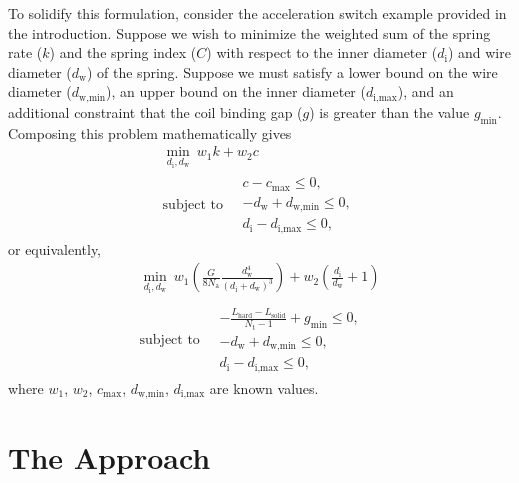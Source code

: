 \documentclass[10pt]{article}
\begin{document}
To solidify this formulation, consider the acceleration switch example provided in the introduction. Suppose we wish to minimize the weighted sum of the spring rate ($k$) and the spring index ($C$) with respect to the inner diameter ($d_{\text{i}}$) and wire diameter ($d_{\text{w}}$) of the spring. Suppose we must satisfy a lower bound on the wire diameter ($d_{\text{w,min}}$), an upper bound on the inner diameter ($d_{\text{i,max}}$), and an additional constraint that the coil binding gap ($g$) is greater than the value $g_{\text{min}}$. Composing this problem mathematically gives
				\begin{equation}
 					\begin{gathered}
 						\min_{d_{\text{i}}, d_{\text{w}}} \ w_{1}k + w_{2}c \\
 						\mbox{subject to} \quad
						 \begin{split} 
						 	c - c_{\text{max}}\le 0, \\
						 	-d_{\text{w}} + d_{\text{w,min}}\le 0, \\
							d_{\text{i}} - d_{\text{i,max}} \le 0,
						\end{split}
					\end{gathered}
				\end{equation}
or equivalently,
 					\begin{equation}
 					\begin{gathered}
 						\min_{d_{\text{i}}, d_{\text{w}}} \ w_{1}\left(\frac{G}{8N_{\text{a}}}\frac{d_{\text{w}}^{4}}{(d_{\text{i}} + d_{\text{w}})^{3}}\right) + w_{2}\left(\frac{d_{\text{i}}}{d_{\text{w}}} + 1\right) \\ \\
 						\mbox{subject to} \quad
						 \begin{split} 
						 	-\frac{L_{\text{hard}} - L_{\text{solid}}}{N_{\text{t}} - 1} + g_{\text{min}}\le 0, \\
						 	-d_{\text{w}} + d_{\text{w,min}}\le 0, \\
							d_{\text{i}} - d_{\text{i,max}} \le 0,
						\end{split}
					\end{gathered}
					\label{eq:Problem}
				\end{equation}				
where $w_{1}$, $w_{2}$, $c_{\text{max}}$, $d_{\text{w,min}}$, $d_{\text{i,max}}$ are known values.

\section{The Approach}
\label{sec:The_Approach}
\end{document}

